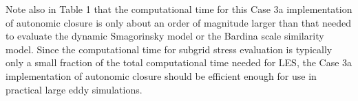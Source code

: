 Note also in Table 1 that the computational time for this Case 3a implementation of autonomic closure is only about an order of magnitude larger than that needed to evaluate the dynamic Smagorinsky model or the Bardina scale similarity model. Since the computational time for subgrid stress evaluation is typically only a small fraction of the total computational time needed for LES, the Case 3a implementation of autonomic closure should be efficient enough for use in practical large eddy simulations.
